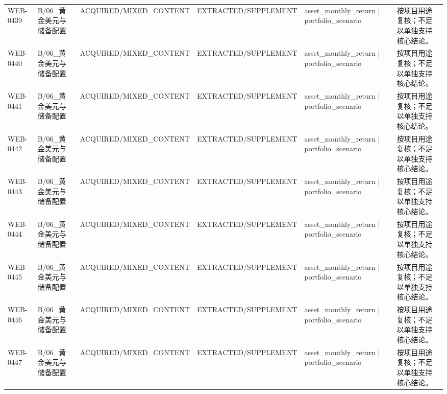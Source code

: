 \begin{landscape}
\begin{longtable}{p{1.8cm}p{2.6cm}p{2.6cm}p{2.6cm}p{4.8cm}p{7.2cm}}
WEB-0439 & B/\allowbreak{}06\_\allowbreak{}黄金美元与储备配置 & ACQUIRED/\allowbreak{}MIXED\_\allowbreak{}CONTENT & EXTRACTED/\allowbreak{}SUPPLEMENT & asset\_\allowbreak{}monthly\_\allowbreak{}return | portfolio\_\allowbreak{}scenario & 按项目用途复核；不足以单独支持核心结论。\\
WEB-0440 & B/\allowbreak{}06\_\allowbreak{}黄金美元与储备配置 & ACQUIRED/\allowbreak{}MIXED\_\allowbreak{}CONTENT & EXTRACTED/\allowbreak{}SUPPLEMENT & asset\_\allowbreak{}monthly\_\allowbreak{}return | portfolio\_\allowbreak{}scenario & 按项目用途复核；不足以单独支持核心结论。\\
WEB-0441 & B/\allowbreak{}06\_\allowbreak{}黄金美元与储备配置 & ACQUIRED/\allowbreak{}MIXED\_\allowbreak{}CONTENT & EXTRACTED/\allowbreak{}SUPPLEMENT & asset\_\allowbreak{}monthly\_\allowbreak{}return | portfolio\_\allowbreak{}scenario & 按项目用途复核；不足以单独支持核心结论。\\
WEB-0442 & B/\allowbreak{}06\_\allowbreak{}黄金美元与储备配置 & ACQUIRED/\allowbreak{}MIXED\_\allowbreak{}CONTENT & EXTRACTED/\allowbreak{}SUPPLEMENT & asset\_\allowbreak{}monthly\_\allowbreak{}return | portfolio\_\allowbreak{}scenario & 按项目用途复核；不足以单独支持核心结论。\\
WEB-0443 & B/\allowbreak{}06\_\allowbreak{}黄金美元与储备配置 & ACQUIRED/\allowbreak{}MIXED\_\allowbreak{}CONTENT & EXTRACTED/\allowbreak{}SUPPLEMENT & asset\_\allowbreak{}monthly\_\allowbreak{}return | portfolio\_\allowbreak{}scenario & 按项目用途复核；不足以单独支持核心结论。\\
WEB-0444 & B/\allowbreak{}06\_\allowbreak{}黄金美元与储备配置 & ACQUIRED/\allowbreak{}MIXED\_\allowbreak{}CONTENT & EXTRACTED/\allowbreak{}SUPPLEMENT & asset\_\allowbreak{}monthly\_\allowbreak{}return | portfolio\_\allowbreak{}scenario & 按项目用途复核；不足以单独支持核心结论。\\
WEB-0445 & B/\allowbreak{}06\_\allowbreak{}黄金美元与储备配置 & ACQUIRED/\allowbreak{}MIXED\_\allowbreak{}CONTENT & EXTRACTED/\allowbreak{}SUPPLEMENT & asset\_\allowbreak{}monthly\_\allowbreak{}return | portfolio\_\allowbreak{}scenario & 按项目用途复核；不足以单独支持核心结论。\\
WEB-0446 & B/\allowbreak{}06\_\allowbreak{}黄金美元与储备配置 & ACQUIRED/\allowbreak{}MIXED\_\allowbreak{}CONTENT & EXTRACTED/\allowbreak{}SUPPLEMENT & asset\_\allowbreak{}monthly\_\allowbreak{}return | portfolio\_\allowbreak{}scenario & 按项目用途复核；不足以单独支持核心结论。\\
WEB-0447 & B/\allowbreak{}06\_\allowbreak{}黄金美元与储备配置 & ACQUIRED/\allowbreak{}MIXED\_\allowbreak{}CONTENT & EXTRACTED/\allowbreak{}SUPPLEMENT & asset\_\allowbreak{}monthly\_\allowbreak{}return | portfolio\_\allowbreak{}scenario & 按项目用途复核；不足以单独支持核心结论。\\

\end{longtable}
\end{landscape}
